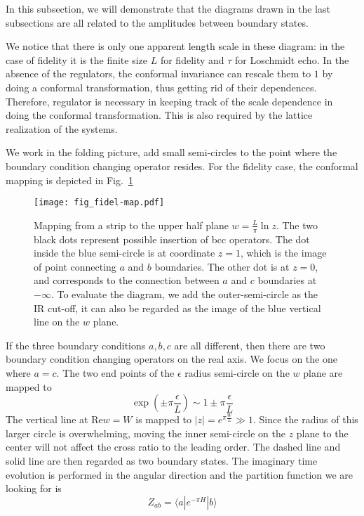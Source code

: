 
In this subsection, we will demonstrate that the diagrams drawn in the last subsections are all related to the amplitudes between boundary states. 

We notice that there is only one apparent length scale in these diagram: in the case of fidelity it is the finite size $L$ for fidelity and $\tau$ for Loschmidt echo. In the absence of the regulators, the conformal invariance can rescale them to $1$ by doing a conformal transformation, thus getting rid of their dependences. Therefore, regulator is necessary in keeping track of the scale dependence in doing the conformal transformation. This is also required by the lattice realization of the systems. 

We work in the folding picture, add small semi-circles to the point where the boundary condition changing operator resides. For the fidelity case, the conformal mapping is depicted in Fig.~\ref{fig:fidel-map} 
\begin{figure}[h]
\centering
\texttt{[image: fig\_fidel-map.pdf]}
\caption{Mapping from a strip to the upper half plane $w = \frac{L}{\pi} \ln z $. The two black dots represent possible insertion of bcc operators. The dot inside the blue semi-circle is at coordinate $z = 1$, which is the image of point connecting $a$ and $b$ boundaries. The other dot is at $z = 0$, and corresponds to the connection between $a$ and $c$ boundaries at $- \infty$. To evaluate the diagram, we add the outer-semi-circle as the IR cut-off, it can also be regarded as the image of the blue vertical line on the $w$ plane.}
\label{fig:fidel-map}
\end{figure}
If the three boundary conditions $a, b, c$ are all different, then there are two boundary condition changing operators on the real axis. We focus on the one where $a = c$. The two end points of the $\epsilon$ radius semi-circle on the $w$ plane are mapped to
\begin{equation}
\exp( \pm \pi \frac{\epsilon}{ L}  ) \sim 1 \pm \pi \frac{\epsilon}{L} 
\end{equation}
The vertical line at $\text{Re} w = W$ is mapped to $|z| = e^{\pi \frac{W}{L} } \gg 1 $. Since the radius of this larger circle is overwhelming, moving the inner semi-circle on the $z$ plane to the center will not affect the cross ratio to the leading order. The dashed line and solid line are then regarded as two boundary states. The imaginary time evolution is performed in the angular direction and the partition function we are looking for is
\begin{equation}
  Z_{ab} = \langle a | e^{-\pi H } |b \rangle 
\end{equation}

